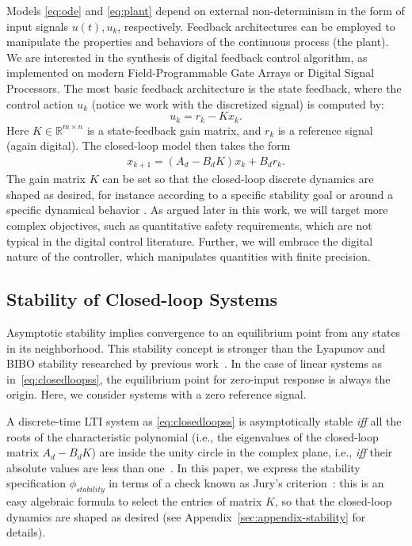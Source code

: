 \documentclass[runningheads,a4paper]{llncs}
\begin{document}
Models \eqref{eq:ode} and \eqref{eq:plant} depend on external non-determinism in the form of input signals $u (t), u_k$, respectively. 
Feedback architectures can be employed to manipulate the properties and behaviors of the continuous process (the plant).   
We are interested in the synthesis of digital feedback control algorithm, 
as implemented on modern Field-Programmable Gate Arrays or Digital Signal Processors. 
The most basic feedback architecture is the state feedback, 
where the control action $u_k$ (notice we work with the discretized signal) is computed by: 
%
\begin{equation}
\label{eq:controlaction}
u_k = r_{k} - K x_k. 
\end{equation}
%
Here $K \in \mathbb{R}^{m \times n}$ is a state-feedback gain matrix, 
and $r_{k}$ is a reference signal (again digital).   
%
The closed-loop model then takes the form 
\begin{align}
\label{eq:closedloopss}
x_{k+1} = ( A_d - B_d K ) x_k + B_d r_k.
\end{align}
%
The gain matrix $K$ can be set so that the closed-loop discrete dynamics are
shaped as desired, for instance according to a specific stability goal or
around a specific dynamical behavior \cite{astrom1997computer}.  As argued
later in this work, we will target more complex objectives, such as
quantitative safety requirements, which are not typical in the digital
control literature.  Further, we will embrace the digital nature of the
controller, which manipulates quantities with finite precision.

\subsection{Stability of Closed-loop Systems}
\label{ssec:stability}

Asymptotic stability implies convergence to an equilibrium point from any
states in its neighborhood.  This stability concept is stronger than the
Lyapunov and BIBO stability researched by previous
work~\cite{DBLP:conf/emsoft/RavanbakhshS16, hscc-paper,
DBLP:conf/hybrid/RouxJG15, DBLP:conf/hybrid/WangGRJF16}.  In the case of
linear systems as in~\eqref{eq:closedloopss}, the equilibrium point for
zero-input response is always the origin.  Here, we consider systems with a
zero reference signal.

A discrete-time LTI system as \eqref{eq:closedloopss} is asymptotically
stable \textit{iff} all the roots of the characteristic polynomial (i.e.,
the eigenvalues of the closed-loop matrix $A_d - B_d K$) are inside the
unity circle in the complex plane, i.e., \textit{iff} their absolute values
are less than one~\cite{astrom1997computer}.  In this paper, we express the
stability specification $\phi_{stability}$ in terms of a check known as
Jury's criterion~\cite{fadali}: this is an easy algebraic formula to select
the entries of matrix $K$, so that the closed-loop dynamics are shaped as
desired (see Appendix~\ref{sec:appendix-stability} for details).
\end{document}

